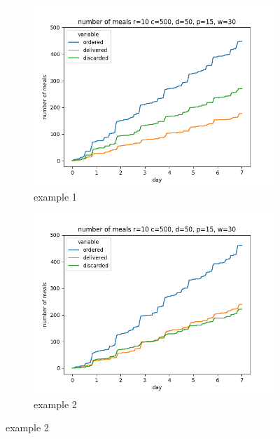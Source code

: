 \begin{center}

    \begin{figure}
        \centering
        \begin{subfigure}[m]{0.30\textwidth}
            \centering
            \includegraphics[width=\textwidth]{sections/run2/week_nd_1_food_ordering_distribution_500_10_50_30}
            \caption{example 1}
        \end{subfigure}
        \hfill
        \begin{subfigure}[m]{0.30\textwidth}
            \centering
            \includegraphics[width=\textwidth]{sections/run2/week_nd_2_food_ordering_distribution_500_10_50_30}
            \caption{example 2}

\end{subfigure}
\end{figure}
\end{center}
